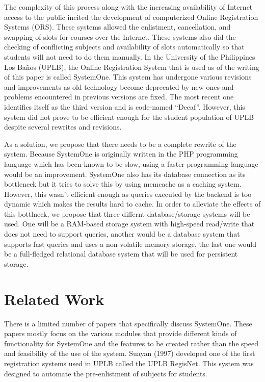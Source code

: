 \documentclass{sigchi}
\begin{document}
The complexity of this process along with the increasing availability of Internet access to
the public incited the development of computerized Online Registration Systems (ORS). These
systems allowed the enlistment, cancellation, and swapping of slots for courses over the Internet.
These systems also did the checking of conflicting subjects and availability of slots automatically
so that students will not need to do them manually.
In the University of the Philippines Los Baños (UPLB), the Online Registration System that
is used as of the writing of this paper is called SystemOne. This system has undergone various
revisions and improvements as old technology become deprecated by new ones and problems
encountered in previous versions are fixed. The most recent one identifies itself as the third
version and is code-named “Decaf”. However, this system did not prove to be efficient enough
for the student population of UPLB despite several rewrites and revisions.

As a solution, we propose that there needs to be a complete rewrite of 
the system. Because SystemOne is originally written in the PHP programming 
language which has been known to be slow, using a faster programming language 
would be an improvement. SystemOne also has its database connection as its 
bottleneck but it tries to solve this by using memcache as a caching system. 
However, this wasn't efficient enough as queries executed by the backend is too
dynamic which makes the results hard to cache. In order to alleviate the effects
of this bottlneck, we propose that three differnt database/storage systems will
be used. One will be a RAM-based storage system with high-speed read/write that
does not need to support queries, another would be a database system that 
supports fast queries and uses a non-volatile memory storage, the last one would
be a full-fledged relational database system that will be used for persistent
storage.

\section{Related Work}

There is a limited number of papers that specifically discuss SystemOne. These papers
mostly focus on the various modules that provide different kinds of functionality for SystemOne
and the features to be created rather than the speed and feasibility of the use of the system.
Suayan (1997) developed one of the first registration systems used in UPLB called the
UPLB RegisNet. This system was designed to automate the pre-enlistment of subjects for
students.
\end{document}

